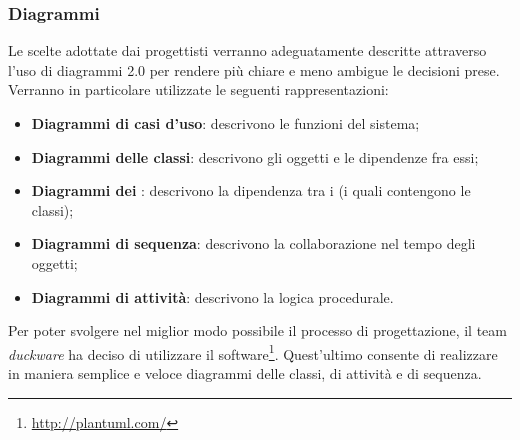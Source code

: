 \subsubsection{Diagrammi}
Le scelte adottate dai progettisti verranno adeguatamente descritte attraverso l’uso di diagrammi  2.0 per rendere più chiare e meno ambigue le decisioni prese. Verranno in particolare utilizzate le seguenti rappresentazioni:
\begin{itemize}
	\item \textbf{Diagrammi di casi d’uso}: descrivono le funzioni del sistema;
	\item \textbf{Diagrammi delle classi}: descrivono gli oggetti e le dipendenze fra essi;
	\item \textbf{Diagrammi dei }: descrivono la dipendenza tra i  (i quali contengono le classi);
	\item \textbf{Diagrammi di sequenza}: descrivono la collaborazione nel tempo degli oggetti;
	\item \textbf{Diagrammi di attività}: descrivono la logica procedurale.
\end{itemize}
Per poter svolgere nel miglior modo possibile il processo di progettazione, il team \textit{duckware} ha deciso di utilizzare il software\footnote{\href{http://plantuml.com/}{http://plantuml.com/}}. Quest'ultimo consente di realizzare in maniera semplice e veloce diagrammi delle classi, di attività e di sequenza.
